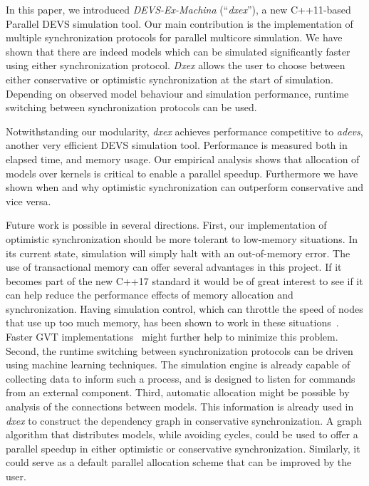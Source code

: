 In this paper, we introduced \textit{DEVS-Ex-Machina} (``\textit{dxex}''), a new C++11-based \textsf{Parallel DEVS} simulation tool.
Our main contribution is the implementation of multiple synchronization protocols for parallel multicore simulation.
We have shown that there are indeed models which can be simulated significantly faster using either synchronization protocol.
\textit{Dxex} allows the user to choose between either conservative or optimistic synchronization at the start of simulation.
Depending on observed model behaviour and simulation performance, runtime switching between synchronization protocols can be used.

Notwithstanding our modularity, \textit{dxex} achieves performance competitive to \textit{adevs}, another very efficient \textsf{DEVS} simulation tool.
Performance is measured both in elapsed time, and memory usage.
Our empirical analysis shows that allocation of models over kernels is critical to enable a parallel speedup. Furthermore we have shown when and why optimistic synchronization can outperform conservative and vice versa.

Future work is possible in several directions.
First, our implementation of optimistic synchronization should be more tolerant to low-memory situations.
In its current state, simulation will simply halt with an out-of-memory error. The use of transactional memory can offer several advantages in this project. If it becomes part of the new C++17 standard it would be of great interest to see if it can help reduce the performance effects of memory allocation and synchronization.
Having simulation control, which can throttle the speed of nodes that use up too much memory, has been shown to work in these situations~\cite{FujimotoBook}.
Faster GVT implementations~\cite{Fujimoto:1997:CGV:268403.268404,Bauer:2005:SND:1069810.1070159} might further help to minimize this problem.
Second, the runtime switching between synchronization protocols can be driven using machine learning techniques.
The simulation engine is already capable of collecting data to inform such a process, and is designed to listen for commands from an external component.
Third, automatic allocation might be possible by analysis of the connections between models.
This information is already used in \textit{dxex} to construct the dependency graph in conservative synchronization.
A graph algorithm that distributes models, while avoiding cycles, could be used to offer a parallel speedup in either optimistic or conservative synchronization.
Similarly, it could serve as a default parallel allocation scheme that can be improved by the user.

